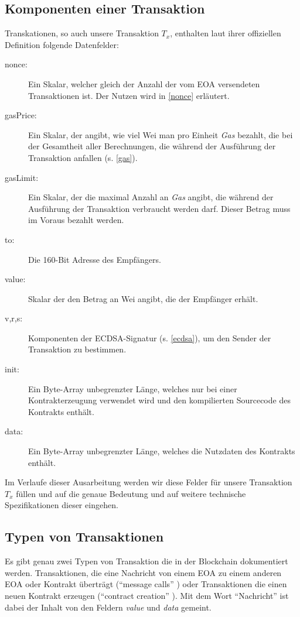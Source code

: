 \documentclass[runningheads]{llncs}
\begin{document}
\subsection{Komponenten einer Transaktion}
\label{komponenten}
Transkationen, so auch unsere Transaktion $T_x$, enthalten laut ihrer offiziellen Definition \cite[S. 4]{wood_ethereum/yellowpaper_2019} folgende Datenfelder:
\begin{description}
  \item[nonce:] Ein Skalar, welcher gleich der Anzahl der vom EOA versendeten Transaktionen ist. Der Nutzen wird in \ref{nonce} erläutert.
  \item[gasPrice:] Ein Skalar, der angibt, wie viel Wei man pro Einheit \textit{Gas} bezahlt, die bei der Gesamtheit aller Berechnungen, die während der Ausführung der Transaktion anfallen (s. \ref{gas}).
  \item[gasLimit:] Ein Skalar, der die maximal Anzahl an \textit{Gas} angibt, die während der Ausführung der Transaktion verbraucht werden darf. Dieser Betrag muss im Voraus bezahlt werden.
  \item[to:] Die 160-Bit Adresse des Empfängers.
  \item[value:] Skalar der den Betrag an Wei angibt, die der Empfänger erhält.
  \item[v,r,s:] Komponenten der ECDSA-Signatur (s. \ref{ecdsa}), um den Sender der Transaktion zu bestimmen.
  \item[init:] Ein Byte-Array unbegrenzter Länge, welches nur bei einer Kontrakterzeugung verwendet wird und den kompilierten Sourcecode des Kontrakts enthält.
  \item[data:] Ein Byte-Array unbegrenzter Länge, welches die Nutzdaten des Kontrakts enthält.
\end{description}
Im Verlaufe dieser Ausarbeitung werden wir diese Felder für unsere Transaktion $T_x$ füllen und auf die genaue Bedeutung und auf weitere technische Spezifikationen dieser eingehen.


\subsection{Typen von Transaktionen}
\label{types}
Es gibt genau zwei Typen von Transaktion die in der Blockchain dokumentiert werden. Transaktionen, die eine Nachricht von einem EOA zu einem anderen EOA oder Kontrakt überträgt ("`message calls"' \cite[S. 4]{wood_ethereum/yellowpaper_2019}) oder Transaktionen die einen neuen Kontrakt erzeugen ("`contract creation"' \cite[S. 4]{wood_ethereum/yellowpaper_2019}). Mit dem Wort "`Nachricht"' ist dabei der Inhalt von den Feldern \textit{value} und \textit{data} gemeint.
\end{document}

